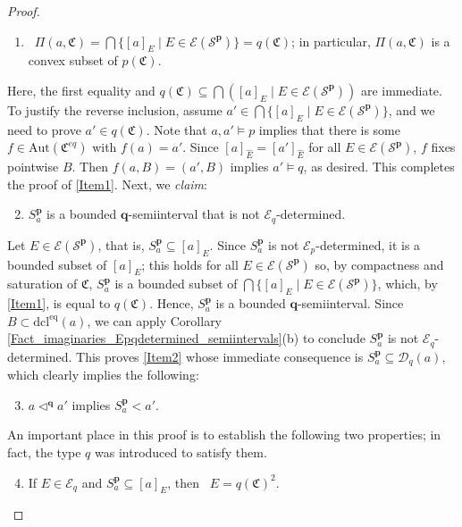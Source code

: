 \documentclass{amsart}
\theoremstyle{definition}
\theoremstyle{definition}
\newcommand{\Mon}{\mathfrak C}
\newcommand{\Moneq}{\mathfrak C^{eq}}
\newcommand{\dcleq}{\mathrm{dcl^{eq}}}
\newcommand{\Aut}{\mathrm{Aut}}
\begin{document}
\begin{proof}
\begin{enumerate}[(1)]
\item\label{Item1} \ $\Pi(a,\Mon)=\bigcap\{[a]_E\mid E\in \mathcal E (\mathcal S^{\mathbf p})\}=q(\Mon)$; in particular, $\Pi(a,\Mon)$ is a convex subset of $p(\Mon)$. 
\end{enumerate}
Here, the first equality and $q(\Mon)\subseteq \bigcap([a]_E\mid E\in \mathcal E (\mathcal S^{\mathbf p}))$ are immediate. To justify the reverse inclusion, assume $a'\in \bigcap\{[a]_E\mid E\in \mathcal E (\mathcal S^{\mathbf p})\}$, and we need to prove $a'\in q(\Mon)$. Note that $a,a'\models p$ implies that there is some $f\in \Aut(\Moneq)$ with $f(a)=a'$. Since $[a]_{\hat E}=[a']_{\hat E}$ for all $E\in\mathcal E (\mathcal S^{\mathbf p})$, $f$ fixes pointwise $B$. Then $f(a,B)=(a',B)$ implies $a'\models q$, as desired. This completes the proof of \ref{Item1}. Next, we {\em claim}: 
\begin{enumerate}[(1)]
\setcounter{enumi}{1}
    \item\label{Item2} $S^{\mathbf p}_a$ is a bounded $\mathbf q$-semiinterval that is not $\mathcal E_q$-determined. 
\end{enumerate}
Let $E\in \mathcal E (\mathcal S^{\mathbf p})$, that is, $S_a^{\mathbf p}\subseteq [a]_E$. Since $S^{\mathbf p}_a$ is not $\mathcal E_p$-determined, it is a bounded subset of $[a]_E$; this holds for all $E\in \mathcal E (\mathcal S^{\mathbf p})$ so, by compactness and saturation of $\Mon$, $S^{\mathbf p}_a$ is a bounded subset of $\bigcap\{[a]_E\mid E\in \mathcal E (\mathcal S^{\mathbf p})\}$, which, by \ref{Item1}, is equal to $q(\Mon)$. Hence, $S^{\mathbf p}_a$ is a bounded $\mathbf q$-semiinterval. Since $B\subset \dcleq(a)$, we can apply Corollary \ref{Fact_imaginaries_Epqdetermined_semiintervals}(b) to conclude $S^{\mathbf p}_a$ is not $\mathcal E_q$-determined. This proves \ref{Item2} whose immediate consequence is $S^{\mathbf p}_a\subseteq \mathcal D_q(a)$, which clearly implies the following:
\begin{enumerate}[(1)]
\setcounter{enumi}{2} 
    \item\label{Item3}  $a\triangleleft^\mathbf q a'$ implies  $S^{\mathbf p}_a<a'$. 
\end{enumerate}
An important place in this proof is to establish the following two properties; in fact, the type $q$ was introduced to satisfy them. 
\begin{enumerate}[(1)]
\setcounter{enumi}{3} 
    \item\label{Item4}  If $E\in\mathcal E_q$ and $S^{\mathbf p}_a\subseteq [a]_E$, then \ $E=q(\Mon)^2$. 

\end{enumerate}
\end{proof}
\end{document}
